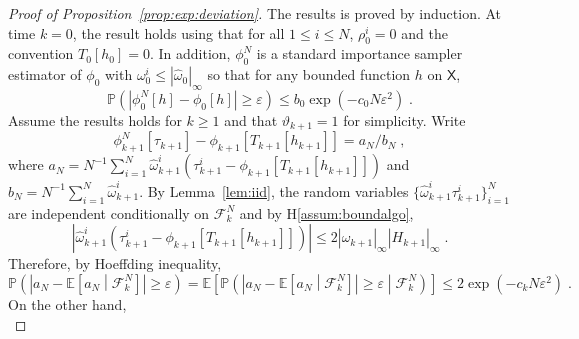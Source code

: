 \documentclass[12pt]{article}
\newcommand{\rmd}{\mathrm{d}}
\newcommand{\eqsp}{\;}
\newcommand{\1}{\mathrm{1}}
\begin{document}

\begin{proof}[Proof of Proposition~\ref{prop:exp:deviation}]
The results is proved by induction. At time $k=0$, the result holds using that for all $1\le i \le N$, $\rho_0^i = 0$ and the convention $T_0[h_0] =0$. In addition, $\phi_0^N$ is a standard importance sampler estimator of $\phi_0$ with $\omega_0^i\le |\widehat{\omega}_0|_{\infty}$ so that for any bounded function $h$ on $\mathsf{X}$,
\[
\mathbb{P}\left(\left|\phi_0^N[h] - \phi_0\left[h\right]\right|\ge \varepsilon\right)\le b_0\exp\left(-c_0N\varepsilon^2\right)\eqsp.
\]
Assume the results holds for $k\ge 1$ and that $\vartheta_{k+1} = 1$ for simplicity. Write
\[
\phi_{k+1}^N[\tau_{k+1}] - \phi_{k+1}\left[T_{k+1}[h_{k+1}]\right] = a_N/b_N\eqsp,
\]
where $a_N = N^{-1}\sum_{i=1}^N \widehat{\omega}_{k+1}^i \left(\tau_{k+1}^i - \phi_{k+1}\left[T_{k+1}[h_{k+1}]\right]\right)$ and $b_N =N^{-1}\sum_{i=1}^N \widehat{\omega}_{k+1}^i$. By Lemma~\ref{lem:iid}, the random variables $\{\widehat{\omega}_{k+1}^i\tau_{k+1}^i\}_{i=1}^N$ are independent conditionally on $\mathcal{F}_k^{N}$ and by H\ref{assum:boundalgo},
\[
\left|\widehat{\omega}_{k+1}^i \left(\tau_{k+1}^i - \phi_{k+1}\left[T_{k+1}[h_{k+1}]\right]\right)\right| \le 2|\widehat{\omega}_{k+1}|_{\infty}|H_{k+1}|_{\infty}\eqsp.
\]
Therefore, by Hoeffding inequality,
\[
\mathbb{P}\left(\left|a_N - \mathbb{E}\left[a_N\middle|\mathcal{F}_k^{N}\right]\right|\ge \varepsilon\right) = \mathbb{E}\left[\mathbb{P}\left(\left|a_N - \mathbb{E}\left[a_N\middle|\mathcal{F}_k^{N}\right]\right|\ge \varepsilon\middle|\mathcal{F}_k^{N}\right)\right]\le 2\exp\left(-c_kN\varepsilon^2\right)\eqsp.
\] 
On the other hand,
\[
\]
\end{proof}
\end{document}
